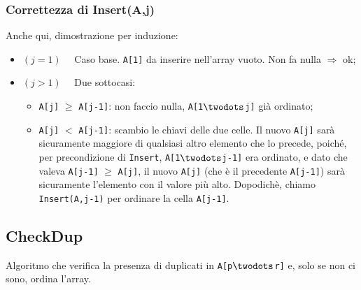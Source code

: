\subsubsection{Correttezza di Insert(A,j)}
Anche qui, dimostrazione per induzione:
\begin{itemize}
	\item[] $(j = 1) \quad$ Caso base. \texttt{A[1]} da inserire nell'array vuoto. Non fa nulla
	$\Rightarrow$ ok;
	\item[] $(j > 1) \quad$ Due sottocasi:
	\begin{itemize}
		\item \texttt{A[j]} $\geq$ \texttt{A[j-1]}: non faccio nulla, \texttt{A[1$\twodots$j]} già
		ordinato;
		\item \texttt{A[j]} $<$ \texttt{A[j-1]}: scambio le chiavi delle due celle. Il nuovo \texttt{A[j]}
		sarà sicuramente maggiore di qualsiasi altro elemento che lo precede, poiché, per precondizione di 
		\texttt{Insert}, \texttt{A[1$\twodots$j-1]} era ordinato, e dato che valeva \texttt{A[j-1]} $\geq$ 
		\texttt{A[j]}, il nuovo \texttt{A[j]} (che è il precedente \texttt{A[j-1]}) sarà sicuramente l'elemento con il valore più alto. 
		Dopodichè, chiamo \texttt{Insert(A,j-1)} per ordinare la cella \texttt{A[j-1]}.
 	\end{itemize}
\end{itemize}

\subsection{CheckDup}
Algoritmo che verifica la presenza di duplicati in \texttt{A[p$\twodots$r]} e, 
solo se non ci sono, ordina l'array.
